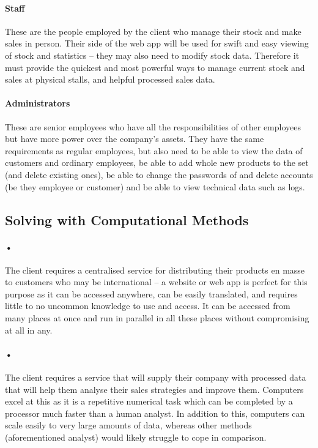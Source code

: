 ﻿\documentclass{article}
\begin{document}
    \paragraph{Staff}
    These are the people employed by the client who manage their stock and make sales in person. 
    Their side of the web app will be used for swift and easy viewing of stock and statistics – they may also need to modify stock data. 
    Therefore it must provide the quickest and most powerful ways to manage current stock and sales at physical stalls, and helpful processed sales data.
    \paragraph{Administrators} 
    These are senior employees who have all the responsibilities of other employees but have more power over the company’s assets. 
    They have the same requirements as regular employees, but also need to be able to view the data of customers and ordinary employees, be able to add whole new products to the set (and delete existing ones), be able to change the passwords of and delete accounts (be they employee or customer) and be able to view technical data such as logs.
    
    \subsection{Solving with Computational Methods}
    \paragraph{•}
    The client requires a centralised service for distributing their products en masse to customers who may be international – a website or web app is perfect for this purpose as it can be accessed anywhere, can be easily translated, and requires little to no uncommon knowledge to use and access. 
    It can be accessed from many places at once and run in parallel in all these places without compromising at all in any.
    \paragraph{•}
    The client requires a service that will supply their company with processed data that will help them analyse their sales strategies and improve them. 
    Computers excel at this as it is a repetitive numerical task which can be completed by a processor much faster than a human analyst. 
    In addition to this, computers can scale easily to very large amounts of data, whereas other methods (aforementioned analyst) would likely struggle to cope in comparison.
\end{document}
